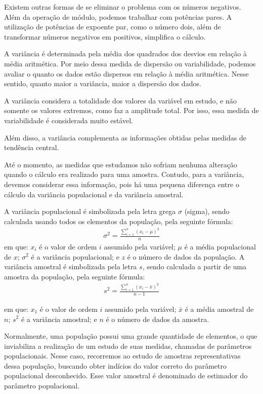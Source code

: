 
Existem outras formas de se eliminar o problema com os números negativos. Além da operação de módulo, podemos trabalhar com potências pares. A utilização de potências de expoente par, como o número dois, além de transformar números negativos em positivos, simplifica o cálculo.

A variância é determinada pela média dos quadrados dos desvios em relação à média aritmética. Por meio dessa medida de dispersão ou variabilidade, podemos avaliar o quanto os dados estão dispersos em relação à média aritmética. Nesse sentido, quanto maior a variância, maior a dispersão dos dados.

A variância considera a totalidade dos valores da variável em estudo, e não somente os valores extremos, como faz a amplitude total. Por isso, essa medida de variabilidade é considerada muito estável.

Além disso, a variância complementa as informações obtidas pelas medidas de tendência central.

Até o momento, as medidas que estudamos não sofriam nenhuma alteração quando o cálculo era realizado para uma amostra. Contudo, para a variância, devemos considerar essa informação, pois há uma pequena diferença entre o cálculo da variância populacional e da variância amostral.

A variância populacional é simbolizada pela letra grega $\sigma$ (sigma), sendo calculada usando todos os elementos da população, pela seguinte fórmula:
\begin{align*}
    \sigma^2=\frac{\sum_{i=1}^{n}(x_i-\mu)^2}{n}
\end{align*}
em que: $x_i$ é o valor de ordem $i$ assumido pela variável; $\mu$ é a média populacional de $x$; $\sigma^2$ é a variância
populacional; e $z$ é o número de dados da população.
A variância amostral é simbolizada pela letra $s$, sendo calculada a partir de uma amostra da população, pela
seguinte fórmula:
\begin{align*}
    s^2=\frac{\sum_{i=1}^{n}(x_i-\bar{x})^2}{n-1}
\end{align*}

em que: $x_1$ é o valor de ordem $i$ assumido pela variável; $\bar{x}$ é a média amostral de $n$; $s^2$ é a variância amostral; e $n$ é o número de dados da amostra.

Normalmente, uma população possui uma grande quantidade de elementos, o que inviabiliza a realização de um estudo de suas medidas, chamadas de parâmetros populacionais. Nesse caso, recorremos ao estudo de amostras representativas dessa população, buscando obter indícios do valor correto do parâmetro populacional desconhecido. Esse valor amostral é denominado de estimador do parâmetro populacional.

